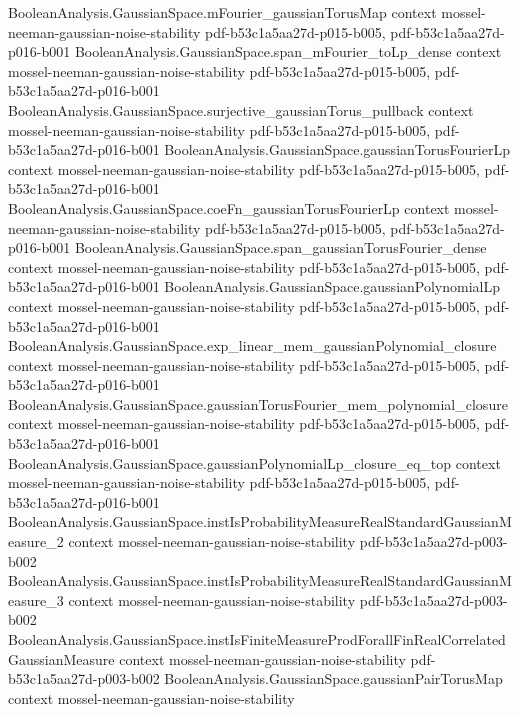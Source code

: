 \begin{theorem}
\proofstep
  {BooleanAnalysis.GaussianSpace.mFourier_gaussianTorusMap}
  {context}
  {mossel-neeman-gaussian-noise-stability}
  {pdf-b53c1a5aa27d-p015-b005,
    pdf-b53c1a5aa27d-p016-b001}
\proofstep
  {BooleanAnalysis.GaussianSpace.span_mFourier_toLp_dense}
  {context}
  {mossel-neeman-gaussian-noise-stability}
  {pdf-b53c1a5aa27d-p015-b005,
    pdf-b53c1a5aa27d-p016-b001}
\proofstep
  {BooleanAnalysis.GaussianSpace.surjective_gaussianTorus_pullback}
  {context}
  {mossel-neeman-gaussian-noise-stability}
  {pdf-b53c1a5aa27d-p015-b005,
    pdf-b53c1a5aa27d-p016-b001}
\proofstep
  {BooleanAnalysis.GaussianSpace.gaussianTorusFourierLp}
  {context}
  {mossel-neeman-gaussian-noise-stability}
  {pdf-b53c1a5aa27d-p015-b005,
    pdf-b53c1a5aa27d-p016-b001}
\proofstep
  {BooleanAnalysis.GaussianSpace.coeFn_gaussianTorusFourierLp}
  {context}
  {mossel-neeman-gaussian-noise-stability}
  {pdf-b53c1a5aa27d-p015-b005,
    pdf-b53c1a5aa27d-p016-b001}
\proofstep
  {BooleanAnalysis.GaussianSpace.span_gaussianTorusFourier_dense}
  {context}
  {mossel-neeman-gaussian-noise-stability}
  {pdf-b53c1a5aa27d-p015-b005,
    pdf-b53c1a5aa27d-p016-b001}
\proofstep
  {BooleanAnalysis.GaussianSpace.gaussianPolynomialLp}
  {context}
  {mossel-neeman-gaussian-noise-stability}
  {pdf-b53c1a5aa27d-p015-b005,
    pdf-b53c1a5aa27d-p016-b001}
\proofstep
  {BooleanAnalysis.GaussianSpace.exp_linear_mem_gaussianPolynomial_closure}
  {context}
  {mossel-neeman-gaussian-noise-stability}
  {pdf-b53c1a5aa27d-p015-b005,
    pdf-b53c1a5aa27d-p016-b001}
\proofstep
  {BooleanAnalysis.GaussianSpace.gaussianTorusFourier_mem_polynomial_closure}
  {context}
  {mossel-neeman-gaussian-noise-stability}
  {pdf-b53c1a5aa27d-p015-b005,
    pdf-b53c1a5aa27d-p016-b001}
\proofstep
  {BooleanAnalysis.GaussianSpace.gaussianPolynomialLp_closure_eq_top}
  {context}
  {mossel-neeman-gaussian-noise-stability}
  {pdf-b53c1a5aa27d-p015-b005,
    pdf-b53c1a5aa27d-p016-b001}
\proofstep
  {BooleanAnalysis.GaussianSpace.instIsProbabilityMeasureRealStandardGaussianMeasure_2}
  {context}
  {mossel-neeman-gaussian-noise-stability}
  {pdf-b53c1a5aa27d-p003-b002}
\proofstep
  {BooleanAnalysis.GaussianSpace.instIsProbabilityMeasureRealStandardGaussianMeasure_3}
  {context}
  {mossel-neeman-gaussian-noise-stability}
  {pdf-b53c1a5aa27d-p003-b002}
\proofstep
  {BooleanAnalysis.GaussianSpace.instIsFiniteMeasureProdForallFinRealCorrelatedGaussianMeasure}
  {context}
  {mossel-neeman-gaussian-noise-stability}
  {pdf-b53c1a5aa27d-p003-b002}
\proofstep
  {BooleanAnalysis.GaussianSpace.gaussianPairTorusMap}
  {context}
  {mossel-neeman-gaussian-noise-stability}

\end{theorem}
